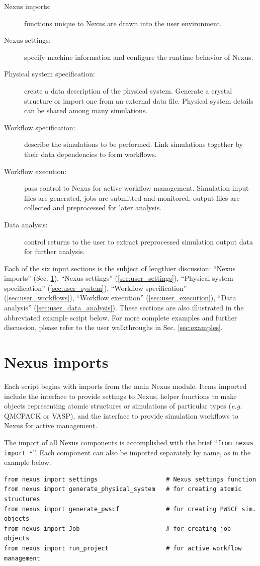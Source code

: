 \documentclass[oneside,11pt]{memoir}
\numberwithin{equation}{section}
\begin{document}
\begin{description}
  \item[Nexus imports:] functions unique to Nexus are drawn into the user environment.
  \item[Nexus settings:] specify machine information and configure the runtime behavior of Nexus.
  \item[Physical system specification:]  create a data description of the physical system.  Generate a crystal structure or import one from an external data file.  Physical system details can be shared among many simulations.
  \item[Workflow specification:] describe the simulations to be performed.  Link simulations together by their data dependencies to form workflows.
  \item[Workflow execution:] pass control to Nexus for active workflow management.  Simulation input files are generated, jobs are submitted and monitored, output files are collected and preprocessed for later analysis.
  \item[Data analysis:] control returns to the user to extract preprocessed simulation output data for further analysis. 
\end{description}


Each of the six input sections is the subject of lengthier discussion: ``Nexus imports'' (Sec. \ref{sec:user_imports}), ``Nexus settings'' (\ref{sec:user_settings}), ``Physical system specification'' (\ref{sec:user_system}),  ``Workflow specification'' (\ref{sec:user_workflows}), ``Workflow execution'' (\ref{sec:user_execution}), ``Data analysis'' (\ref{sec:user_data_analysis}).  These sections are also illustrated in the abbreviated example script below.  For more complete examples and further discussion, please refer to the user walkthroughs in Sec. \ref{sec:examples}.



\section{Nexus imports}\label{sec:user_imports}
Each script begins with imports from the main Nexus module.  Items imported include the interface to provide settings to Nexus, helper functions to make objects representing atomic structures or simulations of particular types (\emph{e.g.} QMCPACK or VASP), and the interface to provide simulation workflows to Nexus for active management. 

The import of all Nexus components is accomplished with the brief ``\texttt{from nexus import *}''.  Each component can also be imported separately by name, as in the example below.
\begin{verbatim}
from nexus import settings                   # Nexus settings function
from nexus import generate_physical_system   # for creating atomic structures
from nexus import generate_pwscf             # for creating PWSCF sim. objects
from nexus import Job                        # for creating job objects
from nexus import run_project                # for active workflow management
\end{verbatim}
\end{document}
